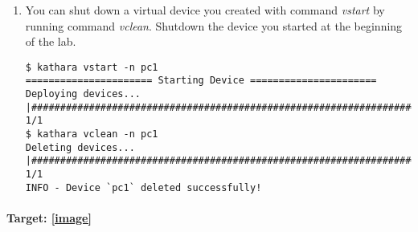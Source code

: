 \documentclass[12pt]{book}
\begin{document}
\begin{enumerate}[label=Activity \arabic*:]
\item You can shut down a virtual device you created with command \emph{vstart} by running command \emph{vclean}. Shutdown the device you started at the beginning of the lab.

\begin{lstlisting}
$ kathara vstart -n pc1
====================== Starting Device ======================
Deploying devices... |##############################################################################| 1/1
$ kathara vclean -n pc1
Deleting devices... |###############################################################################| 1/1
INFO - Device `pc1` deleted successfully!
\end{lstlisting}
\end{enumerate}

\paragraph{Target: \ref{image}}
\end{document}
